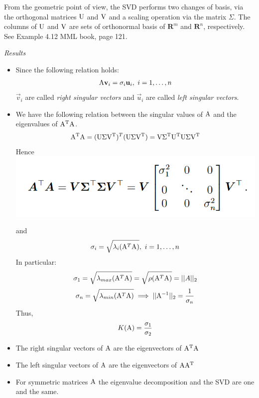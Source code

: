 From the geometric point of view, the SVD performs two changes of basis, via the orthogonal matrices $\mathrm{U}$ and $\mathrm{V}$ and a scaling operation via the matrix $\Sigma$. The columns of $\mathrm{U}$ and $\mathrm{V}$ are sets of orthonormal basis of $\mathbf{R}^m$ and $\mathbf{R}^n$, respectively. See Example 4.12 MML book, page 121.

\textit{Results}
\begin{itemize}
\item Since the following relation holds:
$$\mathrm{A}\mathbf{v}_i=\sigma_i \mathbf{u}_i,\ i = 1, \ldots, n$$
$\vec{v}_i$ are called \textit{right singular vectors} and $\vec{u}_i$ are called \textit{left singular vectors}.
\item 
We have the following relation between the singular values of $\mathrm{A}$ and the eigenvalues of $\mathrm{A^T A}$.
$$\mathrm{A^T A}=(\mathrm{U \Sigma V^T})^T(\mathrm{U \Sigma V^T})=\mathrm{V \Sigma ^T U^T U \Sigma V^T}$$
Hence 
\includegraphics[width=0.7 \textwidth]{sections/images/svd2.png}

and
$$\sigma_i = \sqrt{\lambda_i(\mathrm{A}^T\mathrm{A})},\ i = 1, \hdots, n$$
In particular:
$$ \sigma_1 = \sqrt{\lambda_{max}(\mathrm{A}^T\mathrm{A})} = \sqrt{\rho(\mathrm{A}^T\mathrm{A})} = ||A||_2 $$
$$ \sigma_n = \sqrt{\lambda_{min}(\mathrm{A}^T\mathrm{A})} \implies ||\mathrm{A}^{-1}||_2 = \frac{1}{\sigma_n} $$
Thus,
$$ K(\mathrm{A}) = \frac{\sigma_1}{\sigma_2} $$
\item The right singular vectors of $\mathrm{A}$ are the eigenvectors of $\mathrm{A^T A}$
\item The left singular vectors of $\mathrm{A}$ are the eigenvectors of $\mathrm{AA^T }$
\item For symmetric matrices $\mathrm{A}$ the eigenvalue decomposition and the SVD are one and the same.

\end{itemize}

